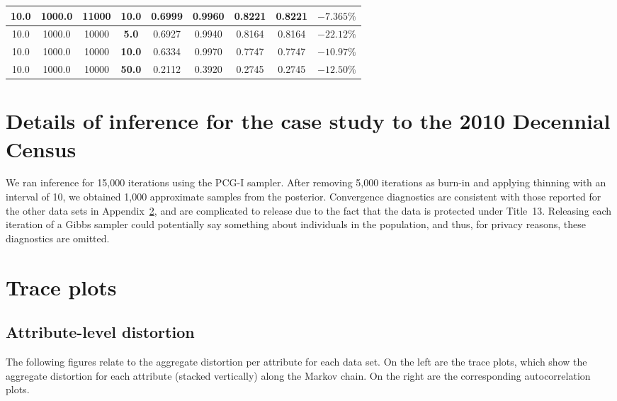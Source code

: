\documentclass[12pt,letterpaper]{article}
\newcommand{\1}[1]{\mathbb{I}\!\left[#1\right]} %
\begin{document}
\begin{table}
\begin{center}
\begin{tabular}{*{9}{c}}
    10.0           & 1000.0           & \textbf{11000} & 10.0          & 0.6999 & 0.9960 & 0.8221 & 0.8221 & $-7.365\%$ \\
    \midrule
    10.0           & 1000.0           & 10000          & \textbf{5.0}  & 0.6927 & 0.9940 & 0.8164 & 0.8164 & $-22.12\%$ \\
    10.0           & 1000.0           & 10000          & \textbf{10.0} & 0.6334 & 0.9970 & 0.7747 & 0.7747 & $-10.97\%$ \\
    10.0           & 1000.0           & 10000          & \textbf{50.0} & 0.2112 & 0.3920 & 0.2745 & 0.2745 & $-12.50\%$ \\
		\bottomrule
  \end{tabular}
  \end{center}
\end{table}


\section{Details of inference for the case study to the 2010 Decennial Census}
\label{app-sec:census-mcmc}
We ran inference for 15,000 iterations using the PCG-I sampler.
After removing 5,000 iterations as burn-in and applying thinning with 
an interval of 10, we obtained 1,000 approximate samples from the 
posterior.
Convergence diagnostics are consistent with those reported for 
the other data sets in Appendix~\ref{app-sec:trace-plots}, 
and are complicated to release due to the fact that the data is 
protected under Title~13. 
Releasing each iteration of a Gibbs sampler could potentially say something 
about individuals in the population, and thus, for privacy reasons, these 
diagnostics are omitted.


\pagebreak
\section{Trace plots}
\label{app-sec:trace-plots}
\subsection{Attribute-level distortion}
The following figures relate to the aggregate distortion per attribute 
for each data set.
On the left are the trace plots, which show the aggregate distortion 
for each attribute (stacked vertically) along the Markov chain.
On the right are the corresponding autocorrelation plots.
\end{document}
